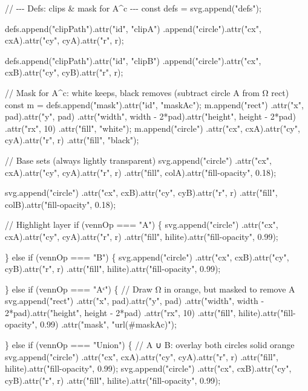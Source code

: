 \documentclass[
  letterpaper,
  DIV=11,
  numbers=noendperiod]{scrreprt}
\newenvironment{Shaded}{\begin{snugshade}}{\end{snugshade}}
\newcommand{\NormalTok}[1]{\textcolor[rgb]{0.00,0.23,0.31}{#1}}
\theoremstyle{definition}
\theoremstyle{plain}
\theoremstyle{definition}
\theoremstyle{remark}
\begin{document}
\begin{Shaded}
\begin{Highlighting}[]
\NormalTok{  // {-}{-}{-} Defs: clips \& mask for A\^{}c {-}{-}{-}}
\NormalTok{  const defs = svg.append("defs");}

\NormalTok{  defs.append("clipPath").attr("id", "clipA")}
\NormalTok{    .append("circle").attr("cx", cxA).attr("cy", cyA).attr("r", r);}

\NormalTok{  defs.append("clipPath").attr("id", "clipB")}
\NormalTok{    .append("circle").attr("cx", cxB).attr("cy", cyB).attr("r", r);}

\NormalTok{  // Mask for A\^{}c: white keeps, black removes (subtract circle A from Ω rect)}
\NormalTok{  const m = defs.append("mask").attr("id", "maskAc");}
\NormalTok{  m.append("rect")}
\NormalTok{    .attr("x", pad).attr("y", pad)}
\NormalTok{    .attr("width", width {-} 2*pad).attr("height", height {-} 2*pad)}
\NormalTok{    .attr("rx", 10)}
\NormalTok{    .attr("fill", "white");}
\NormalTok{  m.append("circle")}
\NormalTok{    .attr("cx", cxA).attr("cy", cyA).attr("r", r)}
\NormalTok{    .attr("fill", "black");}

\NormalTok{  // Base sets (always lightly transparent)}
\NormalTok{  svg.append("circle")}
\NormalTok{    .attr("cx", cxA).attr("cy", cyA).attr("r", r)}
\NormalTok{    .attr("fill", colA).attr("fill{-}opacity", 0.18);}

\NormalTok{  svg.append("circle")}
\NormalTok{    .attr("cx", cxB).attr("cy", cyB).attr("r", r)}
\NormalTok{    .attr("fill", colB).attr("fill{-}opacity", 0.18);}

\NormalTok{  // Highlight layer}
\NormalTok{  if (vennOp === "A") \{}
\NormalTok{    svg.append("circle")}
\NormalTok{      .attr("cx", cxA).attr("cy", cyA).attr("r", r)}
\NormalTok{      .attr("fill", hilite).attr("fill{-}opacity", 0.99);}

\NormalTok{  \} else if (vennOp === "B") \{}
\NormalTok{    svg.append("circle")}
\NormalTok{      .attr("cx", cxB).attr("cy", cyB).attr("r", r)}
\NormalTok{      .attr("fill", hilite).attr("fill{-}opacity", 0.99);}

\NormalTok{  \} else if (vennOp === "Aᶜ") \{}
\NormalTok{    // Draw Ω in orange, but masked to remove A}
\NormalTok{    svg.append("rect")}
\NormalTok{      .attr("x", pad).attr("y", pad)}
\NormalTok{      .attr("width", width {-} 2*pad).attr("height", height {-} 2*pad)}
\NormalTok{      .attr("rx", 10)}
\NormalTok{      .attr("fill", hilite).attr("fill{-}opacity", 0.99)}
\NormalTok{      .attr("mask", "url(\#maskAc)");}

\NormalTok{  \} else if (vennOp === "Union") \{}
\NormalTok{    // A ∪ B: overlay both circles solid orange}
\NormalTok{    svg.append("circle")}
\NormalTok{      .attr("cx", cxA).attr("cy", cyA).attr("r", r)}
\NormalTok{      .attr("fill", hilite).attr("fill{-}opacity", 0.99);}
\NormalTok{    svg.append("circle")}
\NormalTok{      .attr("cx", cxB).attr("cy", cyB).attr("r", r)}
\NormalTok{      .attr("fill", hilite).attr("fill{-}opacity", 0.99);}


\end{Highlighting}
\end{Shaded}
\end{document}
